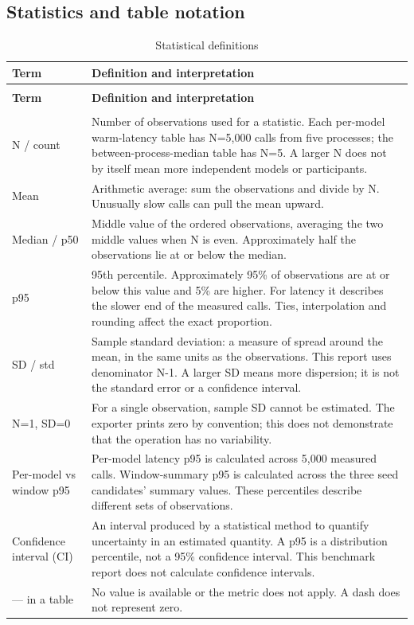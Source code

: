 \documentclass[10pt,a4paper]{article}
\begin{document}
\subsection{Statistics and table notation}
\begingroup\small\setlength{\tabcolsep}{4pt}\renewcommand{\arraystretch}{1.12}
\begin{longtable}{@{}>{\raggedright\arraybackslash}p{}>{\raggedright\arraybackslash}p{}@{}}
\caption{Statistical definitions}\\
\toprule
\textbf{Term} & \textbf{Definition and interpretation} \\
\midrule\endfirsthead
\multicolumn{2}{l}{\small\itshape Continued from previous page}\\
\toprule
\textbf{Term} & \textbf{Definition and interpretation} \\
\midrule\endhead
\midrule\multicolumn{2}{r}{\small Continued on next page}\\\endfoot
\bottomrule\endlastfoot
N /\allowbreak{} count & Number of observations used for a statistic. Each per-model warm-latency table has N=5,000 calls from five processes; the between-process-median table has N=5. A larger N does not by itself mean more independent models or participants. \\
Mean & Arithmetic average:\allowbreak{} sum the observations and divide by N. Unusually slow calls can pull the mean upward. \\
Median /\allowbreak{} p50 & Middle value of the ordered observations, averaging the two middle values when N is even. Approximately half the observations lie at or below the median. \\
p95 & 95th percentile. Approximately 95\% of observations are at or below this value and 5\% are higher. For latency it describes the slower end of the measured calls. Ties, interpolation and rounding affect the exact proportion. \\
SD /\allowbreak{} std & Sample standard deviation:\allowbreak{} a measure of spread around the mean, in the same units as the observations. This report uses denominator N-1. A larger SD means more dispersion; it is not the standard error or a confidence interval. \\
N=1, SD=0 & For a single observation, sample SD cannot be estimated. The exporter prints zero by convention; this does not demonstrate that the operation has no variability. \\
Per-model vs window p95 & Per-model latency p95 is calculated across 5,000 measured calls. Window-summary p95 is calculated across the three seed candidates' summary values. These percentiles describe different sets of observations. \\
Confidence interval (CI) & An interval produced by a statistical method to quantify uncertainty in an estimated quantity. A p95 is a distribution percentile, not a 95\% confidence interval. This benchmark report does not calculate confidence intervals. \\
--- in a table & No value is available or the metric does not apply. A dash does not represent zero. \\
\end{longtable}\endgroup
\end{document}

